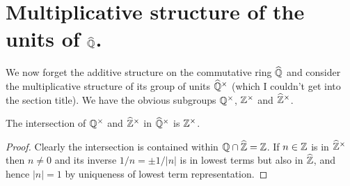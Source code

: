 \section{Multiplicative structure of the units of \texorpdfstring{$\widehat{\mathbb{Q}}$}{Qhat}.}

We now forget the additive structure on the commutative ring $\widehat{\mathbb{Q}}$ and consider
the multiplicative structure of its group of units $\widehat{\mathbb{Q}}^\times$ (which I couldn't
get into the section title). We have the obvious
subgroups $\mathbb{Q}^\times$, $\mathbb{Z}^\times$ and $\widehat{\mathbb{Z}}^\times$.

\begin{lemma}
    \label{Qhat.unitsrat_meet_unitszHat}
    \leanok
    The intersection of $\mathbb{Q}^\times$ and $\widehat{\mathbb{Z}}^\times$ in $\widehat{\mathbb{Q}}^\times$ is $\mathbb{Z}^\times$.
\end{lemma}
\begin{proof}
    Clearly the intersection is contained within $\mathbb{Q}\cap\widehat{\mathbb{Z}}=\mathbb{Z}$. If $n\in\mathbb{Z}$ is in $\widehat{\mathbb{Z}}^\times$
    then $n\not=0$ and its inverse $1/n=\pm1/|n|$ is in lowest terms but also in $\widehat{\mathbb{Z}}$,
    and hence $|n|=1$ by uniqueness of lowest term representation.
\end{proof}

